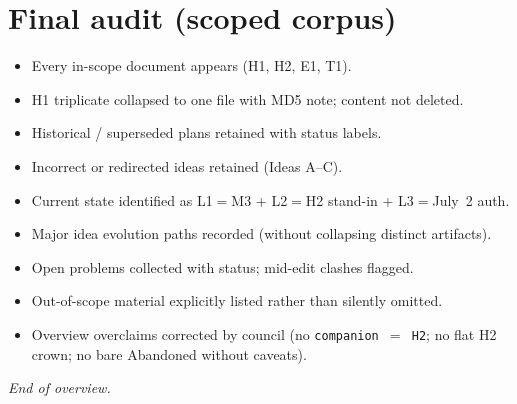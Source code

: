 \documentclass[11pt]{article}
\begin{document}
\section{Final audit (scoped corpus)}
\begin{itemize}[leftmargin=*]
  \item[\checkmark] Every in-scope document appears (H1, H2, E1, T1).
  \item[\checkmark] H1 triplicate collapsed to one file with MD5 note; content not deleted.
  \item[\checkmark] Historical / superseded plans retained with status labels.
  \item[\checkmark] Incorrect or redirected ideas retained (Ideas A--C).
  \item[\checkmark] Current state identified as L1$=$M3 + L2$=$H2 stand-in + L3$=$July~2 auth.
  \item[\checkmark] Major idea evolution paths recorded (without collapsing distinct artifacts).
  \item[\checkmark] Open problems collected with status; mid-edit clashes flagged.
  \item[\checkmark] Out-of-scope material explicitly listed rather than silently omitted.
  \item[\checkmark] Overview overclaims corrected by council (no \texttt{companion $=$ H2};
        no flat H2 crown; no bare Abandoned without caveats).
\end{itemize}

\begin{center}
\textit{End of overview.}
\end{center}
\end{document}
